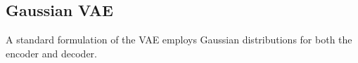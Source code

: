 







\subsection{Gaussian VAE}\label{subsec:optimization-vae}
A standard formulation of the VAE employs Gaussian distributions for both the encoder and decoder.
